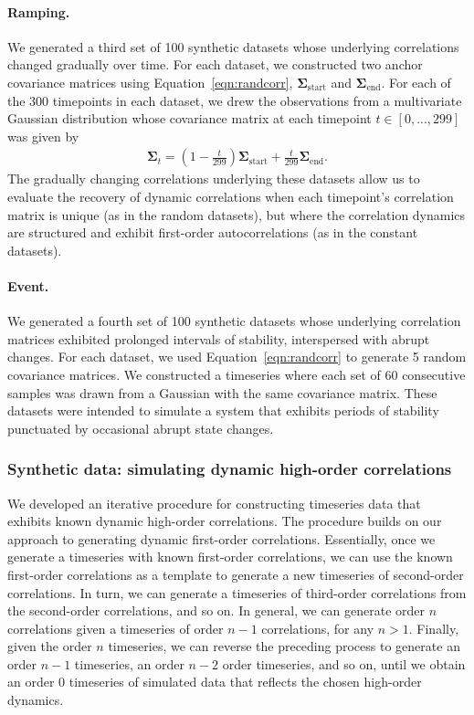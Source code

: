 \documentclass[english]{article}
\begin{document}
  \paragraph*{Ramping.}  We generated a third set of 100 synthetic
  datasets whose underlying correlations changed gradually over time.
  For each dataset, we constructed two anchor covariance
  matrices using Equation~\ref{eqn:randcorr},
  $\mathbf{\Sigma}_{\mathrm{start}}$ and
  $\mathbf{\Sigma}_{\mathrm{end}}$.  For each of the 300 timepoints in
  each dataset, we drew the observations from a multivariate Gaussian
  distribution whose covariance matrix at each timepoint $t \in
  \left[0, ..., 299\right]$ was given by
  \begin{align}
    \mathbf{\Sigma}_t = \left( 1 - \frac{t}{299} \right)
    \mathbf{\Sigma}_{\mathrm{start}} + \frac{t}{299}\mathbf{\Sigma}_{\mathrm{end}}.
  \end{align}
The gradually changing correlations underlying these datasets allow us
to evaluate the recovery of dynamic correlations when each timepoint's
correlation matrix is unique (as in the random datasets), but where
the correlation dynamics are structured and exhibit first-order
autocorrelations (as in the constant datasets).
  
\paragraph*{Event.} We generated a fourth set of 100 synthetic datasets
whose underlying correlation matrices exhibited prolonged intervals of
stability, interspersed with abrupt changes.  For each dataset, we
used Equation~\ref{eqn:randcorr} to generate 5 random covariance
matrices.  We constructed a timeseries where each set of 60 consecutive samples
was drawn from a Gaussian with the same covariance matrix.  These
datasets were intended to simulate a system that exhibits periods of
stability punctuated by occasional abrupt state changes.

\subsubsection*{Synthetic data: simulating dynamic high-order
  correlations}

We developed an iterative procedure for constructing timeseries data
that exhibits known dynamic high-order correlations.  The procedure
builds on our approach to generating dynamic first-order correlations.
Essentially, once we generate a timeseries with known first-order
correlations, we can use the known first-order correlations as a
template to generate a new timeseries of second-order correlations.
In turn, we can generate a timeseries of third-order correlations from
the second-order correlations, and so on.  In general, we can generate
order $n$ correlations given a timeseries of order $n - 1$ correlations,
for any $n > 1$.  Finally, given the order $n$ timeseries, we can
reverse the preceding process to generate an order $n - 1$ timeseries, an
order $n - 2$ order timeseries, and so on, until we obtain an order 0
timeseries of simulated data that reflects the chosen high-order
dynamics.
\end{document}
